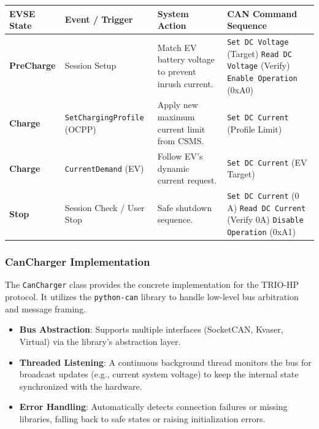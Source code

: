 \documentclass[a4paper,11pt]{report}
\begin{document}
\begin{center}
\begin{tabular}{|l|p{4cm}|p{4cm}|p{4cm}|}
\hline
\textbf{EVSE State} & \textbf{Event / Trigger} & \textbf{System Action} & \textbf{CAN Command Sequence} \\
\hline
\textbf{PreCharge} & Session Setup & Match EV battery voltage to prevent inrush current. & \texttt{Set DC Voltage} (Target) \newline \texttt{Read DC Voltage} (Verify) \newline \texttt{Enable Operation} (0xA0) \\
\hline
\textbf{Charge} & \texttt{SetChargingProfile} (OCPP) & Apply new maximum current limit from CSMS. & \texttt{Set DC Current} (Profile Limit) \\
\hline
\textbf{Charge} & \texttt{CurrentDemand} (EV) & Follow EV's dynamic current request. & \texttt{Set DC Current} (EV Target) \\
\hline
\textbf{Stop} & Session Check / User Stop & Safe shutdown sequence. & \texttt{Set DC Current} (0 A) \newline \texttt{Read DC Current} (Verify 0A) \newline \texttt{Disable Operation} (0xA1) \\
\hline
\end{tabular}
\end{center}

\subsubsection{CanCharger Implementation}
The \texttt{CanCharger} class provides the concrete implementation for the TRIO-HP protocol. It utilizes the \texttt{python-can} library to handle low-level bus arbitration and message framing.
\begin{itemize}
    \item \textbf{Bus Abstraction}: Supports multiple interfaces (SocketCAN, Kvaser, Virtual) via the library's abstraction layer.
    \item \textbf{Threaded Listening}: A continuous background thread monitors the bus for broadcast updates (e.g., current system voltage) to keep the internal state synchronized with the hardware.
    \item \textbf{Error Handling}: Automatically detects connection failures or missing libraries, falling back to safe states or raising initialization errors.
\end{itemize}
\end{document}
